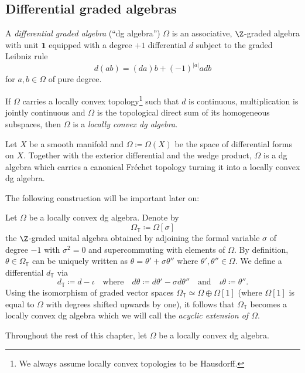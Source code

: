 \documentclass[a4paper, english, 12pt, bibliography=totocnumbered,
index=totoc]{scrartcl}
\begin{document}
\subsection{Differential graded algebras}
\begin{defn}
	A \textit{differential graded algebra} (\enquote{dg algebra}) $\Omega$ is
	an associative, $\Z$-graded algebra with unit $\mathbf{1}$ equipped
	with a degree $+1$ differential $d$ subject to the graded Leibniz
	rule
	\begin{equation*}
		d(ab) = (da)b + (-1)^{\lvert a \rvert}adb
	\end{equation*}
	for  $a, b \in \Omega$ of pure degree.

	If $\Omega$ carries a locally convex topology\footnote{We always assume
		locally convex topologies to be Hausdorff.} such that $d$ is
	continuous, multiplication is jointly continuous and $\Omega$ is the
	topological direct
	sum of its homogeneous subspaces, then $\Omega$ is a \textit{locally
		convex dg algebra}.
\end{defn}
\begin{eg}
	Let $X$ be a smooth manifold and $\Omega \coloneqq \Omega(X)$ be the
	space of differential forms on $X$.
	Together with the exterior differential and the wedge product, $\Omega$
	is a dg algebra which carries a canonical Fréchet topology turning it
	into a locally convex dg algebra.
\end{eg}
The following construction will be important later on:
\begin{eg}\label{Acyclic extension}
	Let $\Omega$ be a locally convex dg algebra.
	Denote by
	\begin{equation*}
		\Omega_{\mathbb{T}} \coloneqq \Omega[\sigma]
	\end{equation*}
	the $\Z$-graded unital algebra obtained by adjoining the formal variable
	$\sigma$ of degree $-1$ with $\sigma^2 = 0$ and supercommuting with
	elements of $\Omega$.
	By definition, $\theta \in \Omega_{\mathbb{T}}$ can be uniquely written as
	$\theta = \theta' + \sigma \theta''$ where $\theta', \theta'' \in \Omega$.
	We define a differential $d_{\mathbb{T}}$ via
	\begin{equation*}
		d_{\mathbb{T}} \coloneqq d - \iota \quad \text{where} \quad d \theta
		\coloneqq
		d \theta' - \sigma d \theta'' \quad \text{and} \quad \iota \theta
		\coloneqq
		\theta''.
	\end{equation*}
	Using the isomorphism of graded vector spaces $\Omega_{\mathbb{T}} \simeq
	\Omega \oplus \Omega[1]$ (where $\Omega[1]$ is equal to $\Omega$ with
	degrees shifted upwards by one), it follows that $\Omega_{\mathbb{T}}$
	becomes a locally convex dg algebra which we will call the
	\textit{acyclic extension of $\Omega$}.
\end{eg}
Throughout the rest of this chapter, let $\Omega$ be a locally convex dg
algebra.
\end{document}
